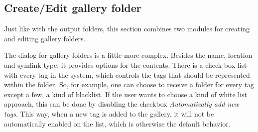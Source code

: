 \subsection{Create/Edit gallery folder}

Just like with the output folders, this section combines two modules for creating and editing gallery folders.

The dialog for gallery folders is a little more complex. Besides the name, location and symlink type, it provides options for the contents. There is a check box list with every tag in the system, which controls the tags that should be represented within the folder. So, for example, one can choose to receive a folder for every tag except a few, a kind of blacklist. If the user wants to choose a kind of white list approach, this can be done by disabling the checkbox \emph{Automatically add new tags}. This way, when a new tag is added to the gallery, it will not be automatically enabled on the list, which is otherwise the default behavior.
